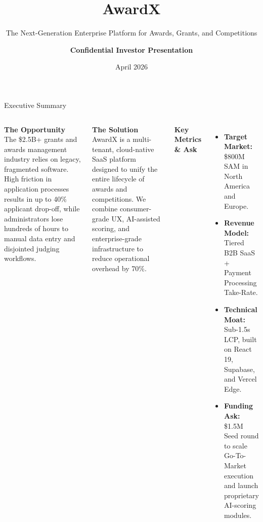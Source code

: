 \documentclass[aspectratio=169, 10pt]{beamer}
\title{\LARGE AwardX}
\subtitle{\vspace{0.2cm}\large The Next-Generation Enterprise Platform for Awards, Grants, and Competitions}
\author{\vspace{0.5cm}\textbf{Confidential Investor Presentation}}
\date{\small April 2026}
\begin{document}
{
\begin{frame}
    \titlepage
\end{frame}
}

\begin{frame}{Executive Summary}
    \begin{columns}[T]
        \textbf{\textcolor{CorporateSecondary}{\faBullseye \quad The Opportunity}}
        \vspace{0.2cm}\\
        The \$2.5B+ grants and awards management industry relies on legacy, fragmented software. High friction in application processes results in up to 40\% applicant drop-off, while administrators lose hundreds of hours to manual data entry and disjointed judging workflows.
        
        \vspace{0.5cm}
        \textbf{\textcolor{CorporateSecondary}{\faRocket \quad The Solution}}
        \vspace{0.2cm}\\
        AwardX is a multi-tenant, cloud-native SaaS platform designed to unify the entire lifecycle of awards and competitions. We combine consumer-grade UX, AI-assisted scoring, and enterprise-grade infrastructure to reduce operational overhead by 70\%.
        
        \textbf{\textcolor{CorporateSecondary}{\faChartLine \quad Key Metrics \& Ask}}
        \vspace{0.2cm}
        \begin{itemize}
            \item \textbf{Target Market:} \$800M SAM in North America and Europe.
            \item \textbf{Revenue Model:} Tiered B2B SaaS + Payment Processing Take-Rate.
            \item \textbf{Technical Moat:} Sub-1.5s LCP, built on React 19, Supabase, and Vercel Edge.
            \item \textbf{Funding Ask:} \$1.5M Seed round to scale Go-To-Market execution and launch proprietary AI-scoring modules.
        \end{itemize}
    \end{columns}
\end{frame}
\end{document}

